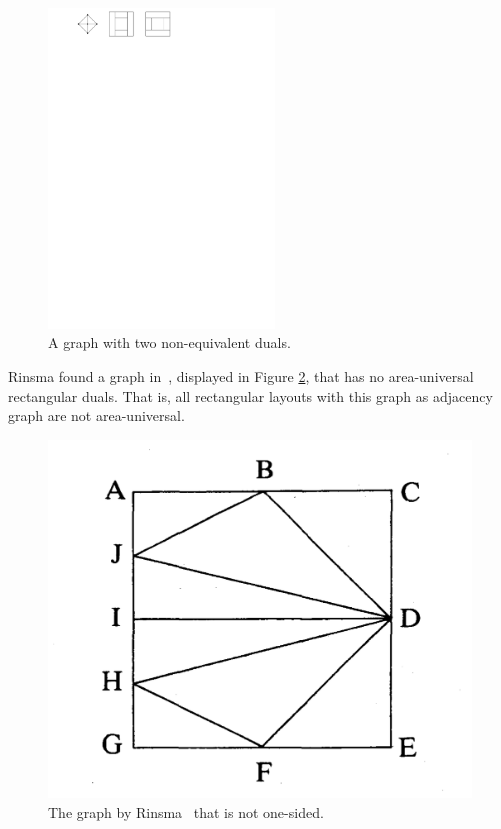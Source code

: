   \begin{figure}
    \centering
    \includegraphics[width=6cm]{introduction/img/nonuniqueRectDual.pdf}
    \caption{A graph with two non-equivalent duals.}
    \label{fig:intro:nonuniqueRectDual}
  \end{figure}

  Rinsma found a graph in~\cite{Rinsma1987}, displayed in Figure \ref{fig:intro:rinsma}, that has no area-universal rectangular duals.
  That is, all rectangular layouts with this graph as adjacency graph are not area-universal.

  \begin{figure}  %
    \includegraphics[scale=.15]{introduction/img/rinsma.png}
    \caption{The graph by Rinsma~\cite{Rinsma1987} that is not one-sided.}
    \label{fig:intro:rinsma}
  \end{figure}

